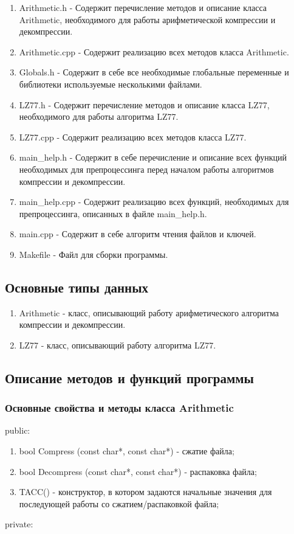 \documentclass[12pt]{article}
\begin{document}
\begin{enumerate}
	\item Arithmetic.h - Содержит перечисление методов и описание класса Arithmetic, необходимого для работы арифметической компрессии и декомпрессии. 
	\item Arithmetic.cpp - Содержит реализацию всех методов класса Arithmetic.
	\item Globals.h - Содержит в себе все необходимые глобальные переменные и библиотеки используемые несколькими файлами.
	\item LZ77.h - Содержит перечисление методов и описание класса LZ77, необходимого для работы алгоритма LZ77.
	\item LZ77.cpp - Содержит реализацию всех методов класса LZ77.
	\item main\_help.h - Содержит в себе перечисление и описание всех функций необходимых для препроцессинга перед началом работы алгоритмов компрессии и декомпрессии.
	\item main\_help.cpp - Содержит реализацию всех функций, необходимых для препроцессинга, описанных в файле main\_help.h.
	\item main.cpp - Содержит в себе алгоритм чтения файлов и ключей.
	\item Makefile - Файл для сборки программы.
\end{enumerate}

\subsection*{Основные типы данных}

\begin{enumerate}
	\item Arithmetic - класс, описывающий работу арифметического алгоритма компрессии и декомпрессии.
	\item LZ77 - класс, описывающий работу алгоритма LZ77.
\end{enumerate}

\subsection*{Описание методов и функций программы}
 
\subsubsection*{Основные свойства и методы класса Arithmetic}
\noindent
public:

\begin{enumerate}
	\item bool Compress (const char*, const char*) - сжатие файла;
	\item bool Decompress (const char*, const char*) - распаковка файла;
	\item TACC() - конструктор, в котором задаются начальные значения для последующей работы со сжатием/распаковкой файла;
\end{enumerate}
\noindent
private:
\end{document}
